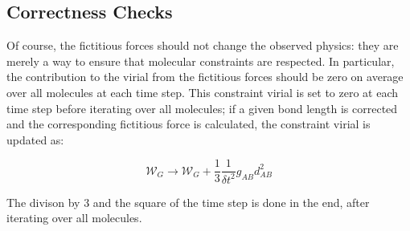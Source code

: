\subsection{Correctness Checks}
\label{sec:correctness-tolerance-checks}
\par Of course, the fictitious forces should not change the observed physics: they are merely a way to ensure that molecular constraints are respected. In particular, the  contribution to the virial from the fictitious forces should be zero on average over all molecules at each time step. This constraint virial is set to zero at each time step before iterating over all molecules; if a given bond length is corrected and the corresponding fictitious force is calculated, the constraint virial is updated as:
\begin{tcolorbox}
\begin{equation}
\label{eq:constraint-virial}
	\mathcal{W}_G \rightarrow \mathcal{W}_G + \frac{1}{3} \frac{1}{\delta t^2} g_{AB} d^2_{AB}
\end{equation}
\end{tcolorbox}
\par The divison by 3 and the square of the time step is done in the end, after iterating over all molecules.